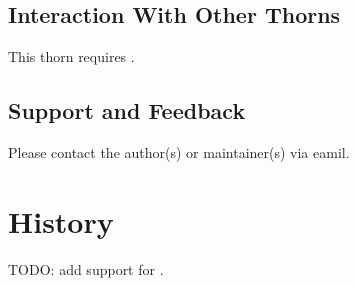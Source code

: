 \subsection{Interaction With Other Thorns}

This thorn requires .

\subsection{Support and Feedback}

Please contact the author(s) or maintainer(s) via eamil.

\section{History}

TODO: add support for .



